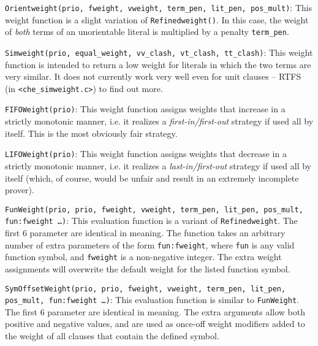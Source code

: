 \documentclass{article}
\begin{document}
\medskip
\begin{sloppypar}
\noindent{}\texttt{Orientweight(prio, fweight, vweight,
    term\_pen, lit\_pen, pos\_mult)}: This weight function is a
slight variation of \texttt{Refinedweight()}. In this case, the weight
of \emph{both} terms of an unorientable literal is multiplied by a
penalty \texttt{term\_pen}.
\end{sloppypar}

\medskip
\begin{sloppypar}
\noindent{}\texttt{Simweight(prio, equal\_weight,
  vv\_clash, vt\_clash, tt\_clash)}: This weight function is intended
to return a low weight for literals in which the two terms are very
similar. It does not currently work very well even for unit clauses --
RTFS (in \texttt{<che\_simweight.c>}) to find out more.
\end{sloppypar}

\medskip
\begin{sloppypar}
\noindent{}\texttt{FIFOWeight(prio)}:
This weight function assigns weights that increase in a strictly
monotonic manner, i.e. it realizes a \emph{first-in/first-out}
strategy if used all by itself. This is the most obviously fair
strategy.
\end{sloppypar}

\medskip
\begin{sloppypar}
\noindent{}\texttt{LIFOWeight(prio)}:
This weight function assigns weights that decrease in a strictly
monotonic manner, i.e. it realizes a \emph{last-in/first-out}
strategy if used all by itself (which, of course, would be unfair and
result in an extremely incomplete prover).
\end{sloppypar}

\medskip
\begin{sloppypar}
  \noindent{}\texttt{FunWeight(prio, prio, fweight, vweight,
    term\_pen, lit\_pen, pos\_mult, fun:fweight \ldots)}: 
  This evaluation function is a variant of \texttt{Refinedweight}. The
  first 6 parameter are identical in meaning. The function takes an
  arbitrary number of extra parameters of the form
  \texttt{fun:fweight}, where \texttt{fun} is any valid function
  symbol, and \texttt{fweight} is a non-negative integer. The extra
  weight assignments will overwrite the default weight for the listed
  function symbol.
\end{sloppypar}

\medskip
\begin{sloppypar}
  \noindent{}\texttt{SymOffsetWeight(prio, prio, fweight, vweight,
    term\_pen, lit\_pen, pos\_mult, fun:fweight \ldots)}: 
  This evaluation function is similar to \texttt{FunWeight}. The first
  6 parameter are identical in meaning.  The extra arguments allow
  both positive and negative values, and are used as once-off weight
  modifiers added to the weight of all clauses that contain the
  defined symbol.
\end{sloppypar}
\end{document}
